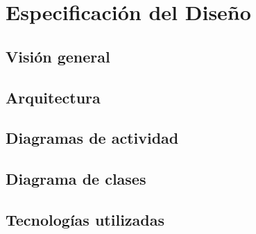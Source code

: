 \chapter{Especificación del Diseño}

\section{Visión general}

\section{Arquitectura}

\section{Diagramas de actividad}

\section{Diagrama de clases}

\section{Tecnologías utilizadas}